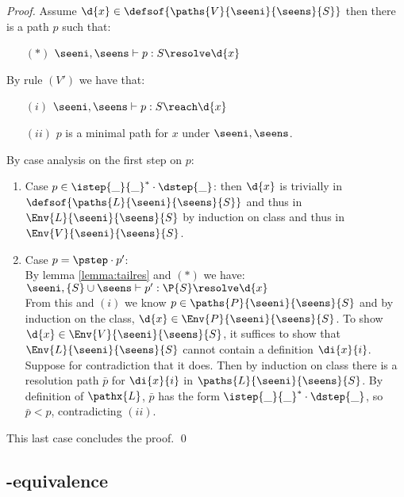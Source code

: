 \begin{proof}
 Assume $\d{x} \in \defsof{\paths{V}{\seeni}{\seens}{S}}$ then there is a path $p$ such that:
\begin{itemize}[leftmargin=15mm]
 \item[$(*)$] $\seeni,\seens \vdash p : S \resolve \d{x}$
\end{itemize}
By rule $(V')$ we have that:
\begin{itemize}[leftmargin=15mm]
 \item[$(i)$] $\seeni,\seens \vdash p : S \reach \d{x}$
 \item[$(ii)$] $p$ is a minimal path for $x$ under $\seeni,\seens$.
\end{itemize}
By case analysis on the first step on $p$: 
\begin{enumerate}
 \item Case $p \in \istep{\_}{\_}^*\cdot \dstep{\_}$: then $\d{x}$ is trivially in $\defsof{\paths{L}{\seeni}{\seens}{S}}$ and 
thus in $\Env{L}{\seeni}{\seens}{S}$ by induction on class and thus in $\Env{V}{\seeni}{\seens}{S}$.

 \item Case $p = \pstep \cdot p'$:\\
 By lemma \ref{lemma:tailres} and $(*)$ we have:\\
\tab $\seeni,\{S\} \cup \seens \vdash p' : \P{S} \resolve \d{x}$ \\
From this and $(i)$ we know $p \in \paths{P}{\seeni}{\seens}{S}$ and by induction on the class, $\d{x} \in \Env{P}{\seeni}{\seens}{S}$.
To show $\d{x} \in \Env{V}{\seeni}{\seens}{S}$, it suffices to show that
$\Env{L}{\seeni}{\seens}{S}$ cannot contain a definition $\di{x}{i}$. 
Suppose for contradiction that it does. 
Then by induction on class there is a resolution path $\bar{p}$ for $\di{x}{i}$ in 
$\paths{L}{\seeni}{\seens}{S}$.  By definition of $\pathx{L}$, $\bar{p}$ has the form
$\istep{\_}{\_}^*\cdot \dstep{\_}$, so $\bar{p} < p$, contradicting $(ii)$.
\end{enumerate}

This last case concludes the proof. \qed
\end{proof}

\subsection{\a-equivalence}\label{subsection:aeqproof}

